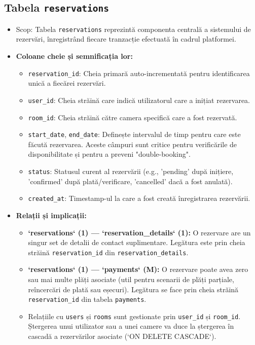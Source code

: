\documentclass[12pt, a4paper, oneside, romanian]{teza-upb}
\begin{document}
\subsection{Tabela \texttt{reservations}}
\begin{itemize}
	\item Scop: Tabela \texttt{reservations} reprezintă componenta centrală a sistemului de rezervări, înregistrând fiecare tranzacție efectuată în cadrul platformei.
	\item \textbf{Coloane cheie și semnificația lor:}
	\begin{itemize}
		\item \texttt{reservation\_id}: Cheia primară auto-incrementată pentru identificarea unică a fiecărei rezervări.
		\item \texttt{user\_id}: Cheia străină care indică utilizatorul care a inițiat rezervarea.
		\item \texttt{room\_id}: Cheia străină către camera specifică care a fost rezervată.
		\item \texttt{start\_date}, \texttt{end\_date}: Definește intervalul de timp pentru care este făcută rezervarea. Aceste câmpuri sunt critice pentru verificările de disponibilitate și pentru a preveni "double-booking".
		\item \texttt{status}: Statusul curent al rezervării (e.g., 'pending' după inițiere, 'confirmed' după plată/verificare, 'cancelled' dacă a fost anulată).
		\item \texttt{created\_at}: Timestamp-ul la care a fost creată înregistrarea rezervării.
	\end{itemize}

	\item \textbf{Relații și implicații:}
	\begin{itemize}
		\item \textbf{`reservations` (1) --- `reservation\_details` (1):} O rezervare are un singur set de detalii de contact suplimentare. Legătura este prin cheia străină \texttt{reservation\_id} din \texttt{reservation\_details}.
		\item \textbf{`reservations` (1) --- `payments` (M):} O rezervare poate avea zero sau mai multe plăți asociate (util pentru scenarii de plăți parțiale, reîncercări de plată sau eșecuri). Legătura se face prin cheia străină \texttt{reservation\_id} din tabela \texttt{payments}.
		\item Relațiile cu \texttt{users} și \texttt{rooms} sunt gestionate prin \texttt{user\_id} și \texttt{room\_id}. Ștergerea unui utilizator sau a unei camere va duce la ștergerea în cascadă a rezervărilor asociate (`ON DELETE CASCADE`).
	\end{itemize}
\end{itemize}
\end{document}

